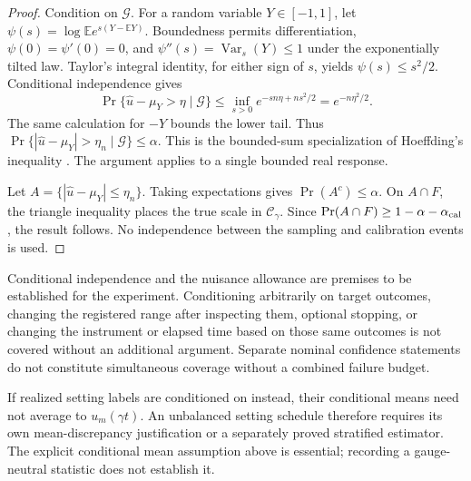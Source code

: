\documentclass[11pt]{article}
\theoremstyle{definition}
\begin{document}
\begin{proof}
Condition on $\mathcal G$. For a random variable $Y\in[-1,1]$, let
$\psi(s)=\log\mathbb E e^{s(Y-\mathbb EY)}$. Boundedness permits
differentiation, $\psi(0)=\psi'(0)=0$, and
$\psi''(s)=\operatorname{Var}_s(Y)\le1$ under the exponentially tilted
law. Taylor's integral identity, for either sign of $s$, yields
$\psi(s)\le s^2/2$. Conditional independence gives
\[
 \Pr\{\widehat u-\mu_Y>\eta\mid\mathcal G\}
 \le\inf_{s>0}e^{-sn\eta+ns^2/2}=e^{-n\eta^2/2}.
\]
The same calculation for $-Y$ bounds the lower tail. Thus
$\Pr\{|\widehat u-\mu_Y|>\eta_n\mid\mathcal G\}\le\alpha$.
This is the bounded-sum specialization of Hoeffding's inequality
\cite{hoeffding}. The argument applies to a single bounded real response.

Let $A=\{|\widehat u-\mu_Y|\le\eta_n\}$. Taking expectations gives
$\Pr(A^c)\le\alpha$. On $A\cap F$, the triangle inequality places the
true scale in $\mathcal C_\gamma$. Since
$\Pr(A\cap F)\ge1-\alpha-\alpha_{\rm cal}$, the result follows.
No independence between the sampling and calibration events is used.
\end{proof}

Conditional independence and the nuisance allowance are premises to be
established for the experiment. Conditioning arbitrarily on target
outcomes, changing the registered range after inspecting them, optional
stopping, or changing the instrument or elapsed time based on those same
outcomes is not covered without an additional argument. Separate nominal confidence statements do not constitute simultaneous coverage without a combined failure budget.

If realized setting labels are conditioned on instead, their conditional
means need not average to $u_m(\gamma t)$. An unbalanced setting schedule
therefore requires its own mean-discrepancy justification or a separately
proved stratified estimator. The explicit conditional mean assumption above
is essential; recording a gauge-neutral statistic does not establish it.
\end{document}
